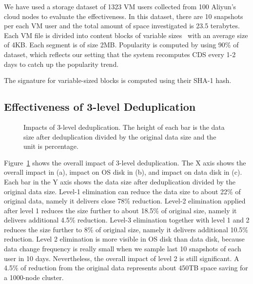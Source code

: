 We have used a storage dataset of  1323 VM users collected from 100 Aliyun's cloud nodes  to evaluate the effectiveness.
In this dataset, there are 10 snapshots per each VM user and the total amount of space investigated 
is 23.5 terabytes.
Each VM file is  divided into content blocks of
variable sizes~\cite{similar94,rabin81} with an average size of 4KB. Each segment is of size 2MB.  
Popularity is computed by using 90\% of dataset, which reflects our setting that the system recomputes
CDS every 1-2 days to catch up the popularity trend.

The signature for variable-sized blocks is computed using  their SHA-1 hash. 



\subsection{Effectiveness of 3-level Deduplication}

\begin{figure}
  \centering
  \caption{Impacts of 3-level deduplication. The height of each bar is the data size after 
deduplication divided by the original data size and the unit is percentage. }

  \label{fig:overall}
\end{figure}

Figure~\ref{fig:overall} shows the overall impact of 3-level deduplication.
The X axis shows the overall impact in (a),  impact on OS disk in (b), and impact on data disk in (c).
Each bar in the Y axis shows the data size after deduplication divided by the original data size.
Level-1 elimination can reduce the data size to about 22\% of original data, namely it delivers close 78\% reduction.
Level-2 elimination applied after level 1
reduces the size further to about 18.5\% of original size, namely it delivers additional 4.5\% reduction.
Level-3 elimination together with level 1 and 2
reduces the size further to 8\% of original size, namely it delivers additional 10.5\% reduction.
Level 2 elimination is more visible in OS disk than data disk, because data change frequency is really small
when we sample last 10 snapshots of each user in 10 days. Nevertheless, the overall impact of level 2 is still significant.
A 4.5\% of reduction from the original data represents about 450TB space saving for a 1000-node cluster.


